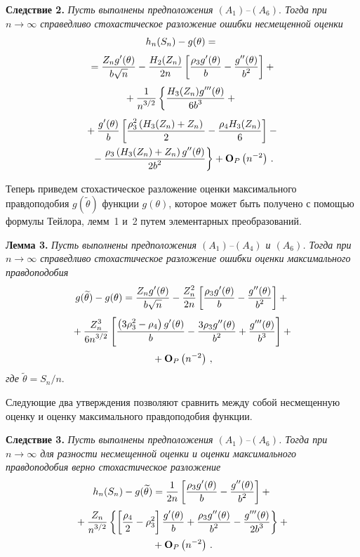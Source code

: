 \begin{multicols}{2}
\medskip

\noindent
{\bf Следствие 2.} {\it Пусть выполнены предположения
    $(A_1)$--$(A_6).$ Тогда при $ n\rightarrow\infty$ справедливо стохастическое
    разложение ошибки несмещенной оценки}
   \begin{multline*}
     h_n(S_n)-g(\theta)={}\\[3pt]
     {}=\fr{Z_n g'(\theta)}{b\sqrt{n}}-
     \fr{H_2(Z_n)}{2n}\left[\fr{\rho_3 g'(\theta)}{b}-
     \fr{g''(\theta)}{b^2}\right]+{}\\[3pt]
     {}+
     \fr{1}{n^{3/2}}
     \left\{ \fr{H_3(Z_n)g'''(\theta)}{6b^3}+{} \right.{}\\[3pt]
            \left.
           {}+\fr{g'(\theta)}{b}
           \left[\fr{\rho_3^2\left(H_3(Z_n)+Z_n \right)}{2}-
                       \fr{\rho_4H_3(Z_n)}{6}
                 \right] -{}\right.\\
\left.{}-           \fr{\rho_3\left(H_3(Z_n)+Z_n \right)g''(\theta)}{2b^2}
     \right\}+ {\bf O}_P\left(n^{-2}\right)\,.
\end{multline*}

  Теперь приведем стохастическое разложение оценки максимального правдоподобия
  $g(\widetilde{\theta})$ функции $g(\theta)$, которое
  может быть получено с помощью формулы Тейлора, лемм~1 и~2 путем
  элементарных преобразований.
\medskip

\noindent
{\bf Лемма 3.} {\it  Пусть выполнены предположения
    $(A_1)$--$(A_4)$ и $(A_6)$. Тогда при $ n\rightarrow\infty$
    справедливо стохастическое разложение ошибки оценки
    максимального правдоподобия
\begin{multline*}
    g(\widetilde{\theta})-g(\theta)=\fr{Z_ng'(\theta)}{b\sqrt{n}}-
     \fr{Z_n^2}{2n} \left[\fr{\rho_3g'(\theta)}{b}-
     \fr{g''(\theta)}{b^2} \right]+{}\\[3pt]
{}+\fr{Z_n^3}{6n^{3/2}}\left[
    \fr{\left(3\rho_3^2-\rho_4 \right)g'(\theta)}{b}-
    \fr{3\rho_3 g''(\theta)}{b^2}+\fr{g'''(\theta)}{b^3}
    \right]+{}\\[3pt]
    {}+{\bf O}_P\left(n^{-2}\right)\,,
\end{multline*}
    где $\widetilde{\theta}=S_n/n.$
   }

  Следующие два утверждения позволяют сравнить между собой
  несмещенную оценку и оценку максимального правдоподобия
  функции.

\medskip

\noindent
{\bf Следствие 3.} {\it Пусть выполнены предположения
    $(A_1)$--$(A_6)$. Тогда при $ n\rightarrow\infty$  для разности
    несмещенной оценки и оценки максимального правдоподобия верно
    стохастическое разложение}
  \begin{multline*}
  h_n(S_n)-g(\widetilde{\theta})=\fr{1}{2n}
      \left[\fr{\rho_3g'(\theta)}{b}-\fr{g''(\theta)}{b^2} \right]+{}
\\[2pt]
{}+\fr{Z_n}{n^{3/2}}\left\{ \left[\fr{\rho_4}{2}-\rho_3^2\right]
      \fr{g'(\theta)}{b}+\fr{\rho_3 g''(\theta)}{b^2}-
      \fr{g'''(\theta)}{2b^3} \right\}+{}\\
      {}+
      {\bf O}_P\left(n^{-2}\right)\,.
\end{multline*}


\end{multicols}
